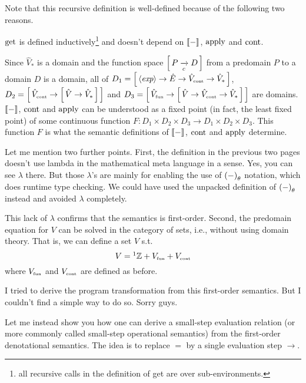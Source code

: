 \begin{enumcirc}
	Note that this recursive definition is well-defined because of the following
	two reasons.
	\begin{enumrm}
		\item
		$\textrm{get}$ is defined inductively\footnote{
			all recursive calls in the definition of get are over sub-environments.
		} and doesn't depend on $\left\llbracket - \right\rrbracket$, $\textrm{apply}$ and $\textrm{cont}$.
		\item
		Since $\hat{V}_*$ is a domain and the function space $\left[ \, P \xrightarrow[c]{} D \, \right]$ from
		a predomain $P$ to a domain $D$ is a domain, all of
		$D_1 = \left[ \, \left\langle \textit{exp} \right\rangle \to \hat{E} \to \hat{V}_{\textrm{\tiny cont}} \to \hat{V}_* \, \right]$,
		$D_2 = \left[ \, \hat{V}_{\textrm{\tiny cont}} \to \left[ \, \hat{V} \to \hat{V}_* \, \right] \, \right]$ and
		$D_3 = \left[ \, \hat{V}_{\textrm{\tiny fun}} \to \left[ \, \hat{V} \to \hat{V}_{\textrm{\tiny cont}} \to \hat{V}_* \, \right] \, \right]$
		are domains.
		$\left\llbracket - \right\rrbracket$, $\textrm{cont}$ and $\textrm{apply}$ can be understood as a fixed point (in fact, the least fixed point) of some continuous function
		$F : D_1 \times D_2 \times D_3 \to D_1 \times D_2 \times D_3$.
		This function $F$ is what the semantic definitions of $\left\llbracket - \right\rrbracket$, $\textrm{cont}$
		and $\textrm{apply}$ determine.
	\end{enumrm}
	\item
	Let me mention two further points.
	First, the definition in the previous two pages doesn't use lambda in the
	mathematical meta language in a sense.
	Yes, you can see $\lambda$ there.
	But those $\lambda$'s are mainly for enabling the use of $\left( - \right)_\theta$
	notation, which does runtime type checking.
	We could have used the unpacked definition of $\left( - \right)_\theta$ instead and
	avoided $\lambda$ completely.

	This lack of $\lambda$ confirms that the semantics is first-order.
	Second, the predomain equation for $V$ can be solved in the category of sets,
	i.e., without using domain theory.
	That is, we can define a set $V$ s.t.
	\[
		V =\footnotemark \Z + \subsctext{V}{fun} + \subsctext{V}{cont}
	\]
	where $V_{\textrm{\tiny fun}}$ and $V_{\textrm{\tiny cont}}$ are defined as before.
	\item
	I tried to derive the program transformation from this first-order semantics.
	But I couldn't find a simple way to do so.
	Sorry guys.

	Let me instead show you how one can derive a small-step evaluation relation (or
	more commonly called small-step operational semantics) from the first-order
	denotational semantics.
	The idea is to replace $=$ by a single evaluation step $\to$.


\end{enumcirc}
